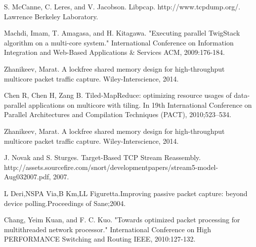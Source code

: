 \documentclass[conference]{IEEEtran}
\begin{document}
\begin{thebibliography}{1}
  S. McCanne, C. Leres, and V. Jacobson. Libpcap. http://www.tcpdump.org/. Lawrence Berkeley Laboratory.
  
  Machdi, Imam, T. Amagasa, and H. Kitagawa. "Executing parallel TwigStack algorithm on a multi-core system." International Conference on Information Integration and Web-Based Applications \& Services ACM, 2009:176-184.
  
  Zhanikeev, Marat. A lockfree shared memory design for high-throughput multicore packet traffic capture. Wiley-Interscience, 2014.
  
  Chen R, Chen H, Zang B. Tiled-MapReduce: optimizing resource usages of data-parallel applications on multicore with tiling. In 19th International Conference on Parallel Architectures and Compilation Techniques (PACT), 2010;523–534.
  
  Zhanikeev, Marat. A lockfree shared memory design for high-throughput multicore packet traffic capture. Wiley-Interscience, 2014.
  
  J. Novak and S. Sturges. Target-Based TCP Stream Reassembly. http://assets.sourcefire.com/snort/developmentpapers/stream5-model-Aug032007.pdf, 2007.
  
  L Deri,NSPA Via,B Km,LL Figuretta.Improving passive packet capture: beyond device polling.Proceedings of Sane;2004.
  
  Chang, Yeim Kuan, and F. C. Kuo. "Towards optimized packet processing for multithreaded network processor." International Conference on High PERFORMANCE Switching and Routing IEEE, 2010:127-132.
  
  
\end{thebibliography}



\end{document}

